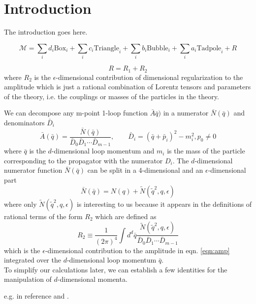 \section{Introduction}
\label{sec:Introduction} 

The introduction goes here.

\begin{equation}
\mathcal{M} = \sum_i d_i \mathrm{Box}_i + \sum_i c_i \mathrm{Triangle}_i + \sum_i b_i \mathrm{Bubble}_i + \sum_i a_i \mathrm{Tadpole}_i + R
\end{equation}

\begin{equation}
R = R_1 + R_2
\end{equation}
where $R_2$ is the $\epsilon$-dimensional contribution of dimensional regularization to the amplitude which is just a rational combination of Lorentz tensors and parameters of the theory, i.e. the couplings or masses of the particles in the theory.


We can decompose any m-point 1-loop function $\bar{A}\bar{q})$ in a numerator $\bar{N}( \bar{q})$ and denominators $\bar{D}_i$
\begin{equation}
\label{eqn:amp}
\bar{A} (\bar{q}) = \frac{\bar{N}(\bar{q})}{\bar{D}_0\bar{D}_1\cdots\bar{D}_{m-1}}, \qquad \bar{D}_i = \left( \bar{q} + \bar{p}_i \right)^2 - m_i^2, p_0 \neq 0
\end{equation}
where $\bar{q}$ is the $d$-dimensional loop momentum and $m_i$ is the mass of the particle corresponding to the propagator with the numerator $D_i$. The $d$-dimensional numerator function $\bar{N}(\bar{q})$ can be split in a 4-dimensional and an $\epsilon$-dimensional part 
\begin{equation}
\bar{N}( \bar{q}) = N (q) + \tilde{N} (\tilde{q}^2,q,\epsilon)
\end{equation}
where only $\tilde{N} (\tilde{q}^2,q,\epsilon)$ is interesting to us because it appears in the definitions of rational terms of the form $R_2$ which are defined as
\begin{equation}
R_2 \equiv \frac{1}{\left( 2\pi \right)^4} \int d^d \bar{q} \frac{\tilde{N} ( \tilde{q}^2,q,\epsilon)}{\bar{D}_0\bar{D}_1\cdots\bar{D}_{m-1}}
\end{equation}
which is the $\epsilon$-dimensional contribution to the amplitude in eqn. \ref{eqn:amp} integrated over the $d$-dimensional loop momentum $\bar{q}$. \\
To simplify our calculations later, we can establish a few identities for the manipulation of $d$-dimensional momenta.

e.g. in reference \cite{R2QCD} and \cite{R2QED}.



